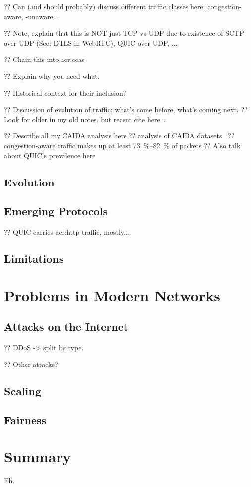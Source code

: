 ?? Can (and should probably) discuss different traffic classes here: congestion-aware, -unaware...

?? Note, explain that this is NOT just TCP vs UDP due to existence of SCTP over UDP (See: DTLS in WebRTC), QUIC over UDP, ...

?? Chain this into \glspl{acr:cca}

?? Explain why you need what.

?? Historical context for their inclusion?

?? Discussion of evolution of traffic: what's come before, what's coming next.
?? Look for older in my old notes, but recent cite here~\parencite{DBLP:conf/anrw/BauerJHBC21}.

?? Describe all my CAIDA analysis here
?? analysis of CAIDA datasets~\parencite{caida-2018-passive}
?? congestion-aware traffic makes up at least \qtyrange{73}{82}{\percent} of packets
?? Also talk about QUIC's prevalence here

\subsection{Evolution}

\subsection{Emerging Protocols}

?? QUIC carries \gls{acr:http} traffic, mostly...

\subsection{Limitations}

\section{Problems in Modern Networks}\label{sec:problems-in-modern-networks}

\subsection{Attacks on the Internet}

?? DDoS -> split by type.

?? Other attacks?

\subsection{Scaling}

\subsection{Fairness}

\section{Summary}
Eh.
